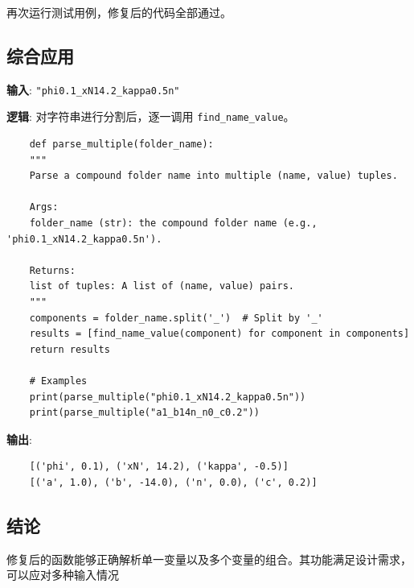 \documentclass{article}
\begin{document}
再次运行测试用例，修复后的代码全部通过。

\subsection*{综合应用}

\textbf{输入}: \texttt{"phi0.1\_xN14.2\_kappa0.5n"}

\textbf{逻辑}: 对字符串进行分割后，逐一调用 \texttt{find\_name\_value}。

\begin{verbatim}
	def parse_multiple(folder_name):
	"""
	Parse a compound folder name into multiple (name, value) tuples.
	
	Args:
	folder_name (str): the compound folder name (e.g., 'phi0.1_xN14.2_kappa0.5n').
	
	Returns:
	list of tuples: A list of (name, value) pairs.
	"""
	components = folder_name.split('_')  # Split by '_'
	results = [find_name_value(component) for component in components]
	return results
	
	# Examples
	print(parse_multiple("phi0.1_xN14.2_kappa0.5n"))
	print(parse_multiple("a1_b14n_n0_c0.2"))
\end{verbatim}

\textbf{输出}:

\begin{verbatim}
	[('phi', 0.1), ('xN', 14.2), ('kappa', -0.5)]
	[('a', 1.0), ('b', -14.0), ('n', 0.0), ('c', 0.2)]
\end{verbatim}

\subsection*{结论}

修复后的函数能够正确解析单一变量以及多个变量的组合。其功能满足设计需求，可以应对多种输入情况
	
\end{document}
